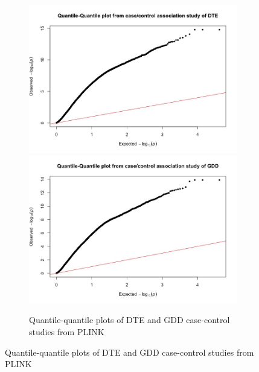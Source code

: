 \documentclass{article}
\begin{document}
\begin{figure}[!htb]
\centering

\begin{subfigure}{\textwidth}
\centering
\includegraphics[scale=.25]{qqplot_cc_dte.jpeg}
\includegraphics[scale=.25]{qqplot_cc_gdd.jpeg}
\caption{Quantile-quantile plots of DTE and GDD case-control studies from PLINK}
\label{fig:plink_qqplot_sub1}
\end{subfigure}


\end{figure}
\end{document}
